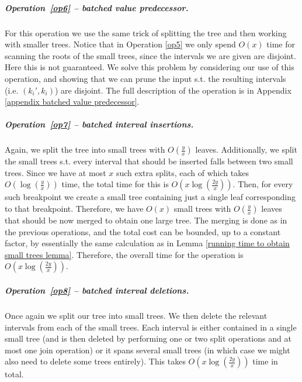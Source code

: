 \documentclass[a4paper,UKenglish]{lipics-v2016}
\theoremstyle{plain}
\renewcommand{\paragraph}{\subparagraph}
\begin{document}
\paragraph{Operation~\ref{op6} -- batched value predecessor.}
For this operation we use the same trick of splitting the tree and then working with smaller trees. Notice that in Operation \ref{op5} we only spend $O(x)$ time for scanning the roots of the small trees, since the intervals we are given are disjoint. Here this is not guaranteed. We solve this problem by considering our use of this operation, and showing that we can prune the input s.t. the resulting intervals (i.e. $(k_i',k_i)$) are disjoint. The full description of the operation is in Appendix \ref{appendix batched value predecessor}.

\paragraph{Operation~\ref{op7} -- batched interval insertions.}
Again, we split the tree into small trees with $O(\frac{y}{x})$ leaves. Additionally, we split the small trees s.t. every interval
that should be inserted falls between two small trees.
Since we have at most $x$ such extra splits, each of which takes $O(\log(\frac{y}{x}))$ time, the total time for this is $O(x\log(\frac{2y}{x}))$.
Then, for every such breakpoint we create a small tree containing just a single leaf corresponding to that
breakpoint. Therefore, we have $O(x)$ small trees with $O(\frac{y}{x})$ leaves that should be now merged
to obtain one large tree.
The merging is done as in the previous operations, and the total cost can be bounded,
up to a constant factor, by essentially the same calculation as in Lemma \ref{running time to obtain small trees lemma}. Therefore, the overall time for the operation is $O(x \log(\frac{2y}{x}))$.

\paragraph{Operation~\ref{op8} -- batched interval deletions.}
Once again we split our tree into small trees. We then delete the relevant intervals from each of the small trees. Each interval is either contained in a single small tree (and is then deleted by performing one or two split operations and at most one join operation) or it spans several small trees (in which case we might also need to delete some trees entirely). This takes $O(x \log(\frac{2y}{x}))$ time in total.
\end{document}
